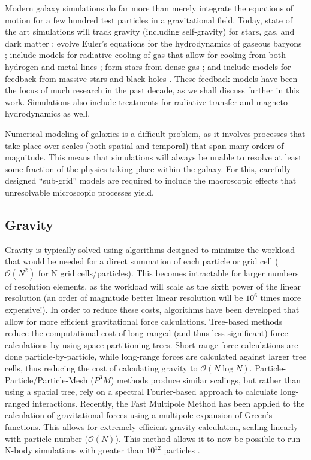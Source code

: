 Modern galaxy simulations do far more than merely integrate the equations of
motion for a few hundred test particles in a gravitational field.  Today, state
of the art simulations will track gravity (including self-gravity) for stars,
gas, and dark matter \citep{Aarseth1980,Stadel2001,Dehnen2002}; evolve Euler's
equations for the hydrodynamics of gaseous baryons
\citep{Wadsley2004,Teyssier2002,Bryan2014}; include models for radiative cooling
of gas that allow for cooling from both hydrogen and metal lines
\citep{Marri2003,Shen2010}; form stars from dense gas
\citep{Katz1992,Agertz2015}; and include models for feedback from massive stars
and black holes \citep{Katz1992,Springel2003,DiMatteo2005}.  These feedback
models have been the focus of much research in the past decade, as we shall
discuss further in this work.  Simulations also include treatments
for radiative transfer \citep{Gendelev2012,Krumholz2013} and
magneto-hydrodynamics \citep{Girichidis2015} as well.

Numerical modeling of galaxies is a difficult problem, as it involves processes
that take place over scales (both spatial and temporal) that span many orders of
magnitude.  This means that simulations will always be unable to resolve at
least some fraction of the physics taking place within the galaxy.  For this,
carefully designed ``sub-grid'' models are required to include the macroscopic
effects that unresolvable microscopic processes yield. 

\subsection{Gravity}
Gravity is typically solved using algorithms designed to minimize the workload
that would be needed for a direct summation of each particle or grid cell
($\mathcal{O}(N^2)$ for N grid cells/particles).  This becomes intractable for
larger numbers of resolution elements, as the workload will scale as the sixth
power of the linear resolution (an order of magnitude better linear resolution
will be $10^6$ times more expensive!).  In order to reduce these costs,
algorithms have been developed that allow for more efficient gravitational
force calculations.  Tree-based methods \citep{Barnes1986} reduce the
computational cost of long-ranged (and thus less significant) force
calculations by using space-partitioning trees.  Short-range force calculations
are done particle-by-particle, while long-range forces are calculated against
larger tree cells, thus reducing the cost of calculating gravity to
$\mathcal{O}(N\log N)$.  Particle-Particle/Particle-Mesh ($P^3M$) methods
\citep{Couchman1991} produce similar scalings, but rather than using a
spatial tree, rely on a spectral Fourier-based approach to calculate long-ranged
interactions.  Recently, the Fast Multipole Method \citep{Greengard1987} has
been applied to the calculation of gravitational forces
\citep{Dehnen2002,Hahn2013} using a multipole expansion of Green's functions.
This allows for extremely efficient gravity calculation, scaling linearly with
particle number ($\mathcal{O}(N)$).  This method allows it to now be possible to
run N-body simulations with greater than $10^{12}$ particles \citep{Potter2016}.


